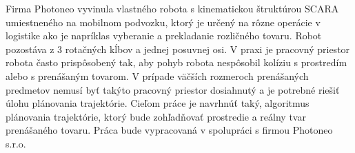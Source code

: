 Firma Photoneo vyvinula vlastného robota s kinematickou štruktúrou SCARA umiestneného na mobilnom podvozku, ktorý je určený na rôzne operácie v logistike ako je napríklas vyberanie a prekladanie rozličného tovaru. Robot pozostáva z 3 rotačných kĺbov a jednej posuvnej osi. V praxi je pracovný priestor robota často prispôsobený tak, aby pohyb robota nespôsobil kolíziu s prostredím alebo s prenášaným tovarom. V prípade väčších rozmeroch prenášaných predmetov nemusí byť takýto pracovný priestor dosiahnutý a je potrebné riešiť úlohu plánovania trajektórie. Cieľom práce je navrhnúť taký, algoritmus plánovania trajektórie, ktorý bude zohľadňovať prostredie a reálny tvar prenášaného tovaru. Práca bude vypracovaná v spolupráci s firmou Photoneo s.r.o.

